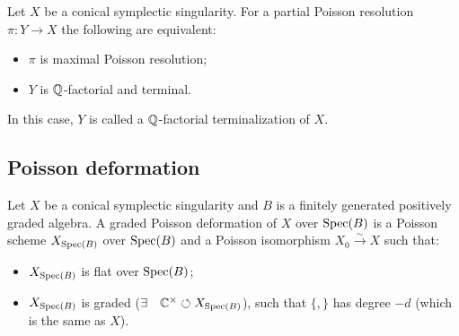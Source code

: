 \begin{thm}
  Let $X$ be a conical symplectic singularity. For a partial Poisson resolution $\pi: Y \to X$ the following are equivalent:
  \begin{itemize}
    \item $\pi$ is maximal Poisson resolution;
    \item $Y$ is $\mathbb{Q}$-factorial and terminal.
  \end{itemize}
\end{thm}

In this case, $Y$ is called a $\mathbb{Q}$-factorial terminalization of $X$.


\subsection{Poisson deformation}

\begin{defn}
  Let $X$ be a conical symplectic singularity and $B$ is a finitely generated positively graded algebra. A graded Poisson deformation of $X$ over $\operatorname{Spec}(B)$ is a Poisson scheme $X_{\operatorname{Spec}(B)}$ over $\operatorname{Spec}(B)$ and a Poisson isomorphism $X_0 \xrightarrow{\sim} X$ such that:
  \begin{itemize}
    \item $X_{\operatorname{Spec}(B)}$ is flat over $\operatorname{Spec}(B)$;
    \item $X_{\operatorname{Spec}(B)}$ is graded ($\exists \quad \mathbb{C}^{\times} \circlearrowleft X_{\operatorname{Spec}(B)}$), such that $\{ , \}$ has degree $-d$ (which is the same as $X$).
  \end{itemize}
\end{defn}

